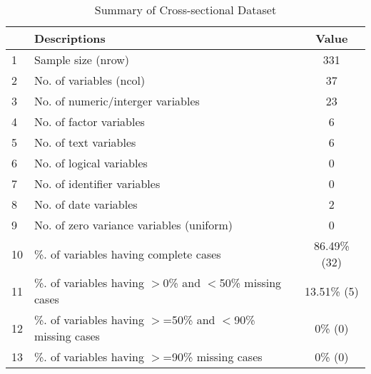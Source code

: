 \begin{table}[ht]
\centering
\caption{Summary of Cross-sectional Dataset} 
\begin{tabular}{llc}
  \hline
 & Descriptions & Value \\ 
  \hline
1 & Sample size (nrow) & 331 \\ 
  2 & No. of variables (ncol) & 37 \\ 
  3 & No. of numeric/interger variables & 23 \\ 
  4 & No. of factor variables & 6 \\ 
  5 & No. of text variables & 6 \\ 
  6 & No. of logical variables & 0 \\ 
  7 & No. of identifier variables & 0 \\ 
  8 & No. of date variables & 2 \\ 
  9 & No. of zero variance variables (uniform) & 0 \\ 
  10 & \%. of variables having complete cases & 86.49\% (32) \\ 
  11 & \%. of variables having $>$0\% and $<$50\% missing cases & 13.51\% (5) \\ 
  12 & \%. of variables having $>$=50\% and $<$90\% missing cases & 0\% (0) \\ 
  13 & \%. of variables having $>$=90\% missing cases & 0\% (0) \\ 
   \hline
\end{tabular}
\end{table}
